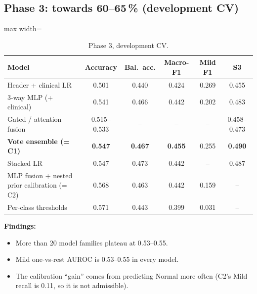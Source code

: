 \subsection{Phase 3: towards 60--65\,\% (development CV)}
\begin{table}[H]\centering\small
\caption{Phase 3, development CV.}\label{tab:p3}
\begin{adjustbox}{max width=\linewidth}
\begin{tabular}{lccccc}\toprule
Model & Accuracy & Bal.\ acc. & Macro-F1 & Mild F1 & S3 \\\midrule
Header + clinical LR & 0.501 & 0.440 & 0.424 & 0.269 & 0.455 \\
3-way MLP (+ clinical) & 0.541 & 0.466 & 0.442 & 0.202 & 0.483 \\
Gated / attention fusion & 0.515--0.533 & -- & -- & -- & 0.458--0.473 \\
\textbf{Vote ensemble (= C1)} & \textbf{0.547} & \textbf{0.467} & \textbf{0.455} & 0.255 & \textbf{0.490} \\
Stacked LR & 0.547 & 0.473 & 0.442 & -- & 0.487 \\
MLP fusion + nested prior calibration (= C2) & 0.568 & 0.463 & 0.442 & 0.159 & -- \\
Per-class thresholds & 0.571 & 0.443 & 0.399 & 0.031 & -- \\\bottomrule
\end{tabular}
\end{adjustbox}
\end{table}
\textbf{Findings:}
\begin{itemize}
  \item More than 20 model families plateau at 0.53--0.55.
  \item Mild one-vs-rest AUROC is 0.53--0.55 in every model.
  \item The calibration ``gain'' comes from predicting Normal more often (C2's Mild recall is 0.11, so it is not
    admissible).
\end{itemize}

